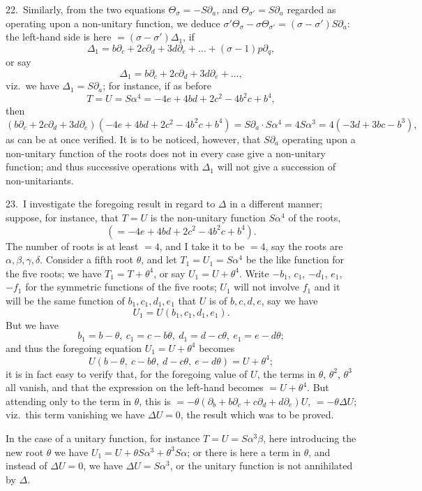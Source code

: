 \documentclass[11pt]{article}
\begin{document}
22.\ Similarly, from the two equations $\Theta_\sigma = -S\partial_a$, and $\Theta_{\sigma'} = S\partial_a$ regarded as operating upon a non-unitary function, we deduce $\sigma' \Theta_\sigma - \sigma \Theta_{\sigma'} = (\sigma - \sigma') S\partial_a$: the left-hand side is here $= (\sigma - \sigma') \Delta_1$, if
\[
\Delta_1 = b \partial_c + 2c \partial_d + 3d \partial_e + \ldots + (\sigma - 1) p \partial_q,
\]
or say
\[
\Delta_1 = b \partial_c + 2c \partial_d + 3d \partial_e + \ldots,
\]
viz.\ we have $\Delta_1 = S\partial_a$; for instance, if as before
\[
T = U = S\alpha^4 = -4e + 4bd + 2c^2 - 4b^2c + b^4,
\]
then
\[
(b\partial_c + 2c\partial_d + 3d\partial_e)(-4e + 4bd + 2c^2 - 4b^2c + b^4) = S\partial_a \cdot S\alpha^4 = 4S\alpha^3 = 4(-3d + 3bc - b^3),
\]
as can be at once verified. It is to be noticed, however, that $S\partial_a$ operating upon a non-unitary function of the roots does not in every case give a non-unitary function; and thus successive operations with $\Delta_1$ will not give a succession of non-unitariants.

23.\ I investigate the foregoing result in regard to $\Delta$ in a different manner; suppose, for instance, that $T = U$ is the non-unitary function $S\alpha^4$ of the roots,
\[
(= -4e + 4bd + 2c^2 - 4b^2c + b^4).
\]
The number of roots is at least $= 4$, and I take it to be $= 4$, say the roots are $\alpha, \beta, \gamma, \delta$. Consider a fifth root $\theta$, and let $T_1 = U_1 = S\alpha^4$ be the like function for the five roots; we have $T_1 = T + \theta^4$, or say $U_1 = U + \theta^4$. Write $-b_1$, $c_1$, $-d_1$, $e_1$, $-f_1$
for the symmetric functions of the five roots; $U_1$ will not involve $f_1$ and it will be the same function of $b_1, c_1, d_1, e_1$ that $U$ is of $b, c, d, e$, say we have
\[
U_1 = U(b_1, c_1, d_1, e_1).
\]
But we have
\[
b_1 = b - \theta,\ c_1 = c - b\theta,\ d_1 = d - c\theta,\ e_1 = e - d\theta;
\]
and thus the foregoing equation $U_1 = U + \theta^4$ becomes
\[
U(b - \theta,\ c - b\theta,\ d - c\theta,\ e - d\theta) = U + \theta^4;
\]
it is in fact easy to verify that, for the foregoing value of $U$, the terms in $\theta$, $\theta^2$, $\theta^3$ all vanish, and that the expression on the left-hand becomes $= U + \theta^4$. But attending only to the term in $\theta$, this is $= -\theta(\partial_b + b\partial_c + c\partial_d + d\partial_e) U$, $= -\theta \Delta U$; viz.\ this term vanishing we have $\Delta U = 0$, the result which was to be proved.

In the case of a unitary function, for instance $T = U = S\alpha^3\beta$, here introducing the new root $\theta$ we have $U_1 = U + \theta S\alpha^3 + \theta^3 S\alpha$; or there is here a term in $\theta$, and instead of $\Delta U = 0$, we have $\Delta U = S\alpha^3$, or the unitary function is not annihilated by $\Delta$.
\end{document}
